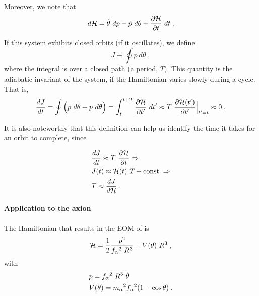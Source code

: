 \documentclass[11pt,a4paper]{article}
\begin{document}
Moreover, we note that
%
\begin{equation}
	d \mathcal{H} = \dot \theta \ d p - \dot p \ d \theta + \dfrac{\partial \mathcal{H}}{\partial t} \ d t \;.  
	\label{eq:total_dH}
\end{equation}


If this system exhibits closed orbits (\eg if it oscillates), we define 
%
\begin{equation}
	J \equiv \oint p \ d \theta \;,
	\label{eq:adiabatic_inv_def}
\end{equation}
%
where the integral is over a closed path (\eg a period, $T$). This quantity is the adiabatic invariant of the system, if the Hamiltonian varies slowly during a cycle. That is,
%
\[
\dfrac{d J}{d t} =  \oint \Big( \dot p \ d \theta + p \ d \dot \theta \Big) = \displaystyle \int_{t}^{t+T}  \dfrac{\partial \mathcal{H}}{\partial t^\prime} \ d t^\prime \approx T \ \dfrac{\partial \mathcal{H}(t^{\prime})}{\partial t^{\prime}}\Big|_{t^{\prime}=t} \approx 0 
\;. 
\]
%

It is also noteworthy that this definition can help us identify the time it takes for an orbit to complete, since 
%

\begin{eqnarray}
	&\dfrac{d J}{d t} \approx  T \ \dfrac{\partial \mathcal{H}}{\partial t} \Rightarrow \nonumber \\
	&J(t) \approx \mathcal{H}(t) \ T + {\rm const.} \Rightarrow \nonumber \\
	&T \approx \dfrac{d J}{d \mathcal{H}} \;.  \nonumber 
\end{eqnarray}

\paragraph{Application to the axion}
%
The Hamiltonian that results in the EOM of  is
%
\begin{equation}
	\mathcal{H} = \dfrac{1}{2} \dfrac{p^2}{f_{\alpha}{}^2 \ R^3} + V(\theta) \ R^3\;,
	\label{eq:axion_H}
\end{equation}
%
with 
%
\begin{eqnarray}
	& p = f_{\alpha}{}^2 \ R^3 \ \dot \theta \\
	\label{eq:momentum}
	& V(\theta) = m_\alpha{}^2 f_{\alpha}{}^2 (1-\cos \theta) \;.
	\label{eq:potential}
\end{eqnarray}
\end{document}
